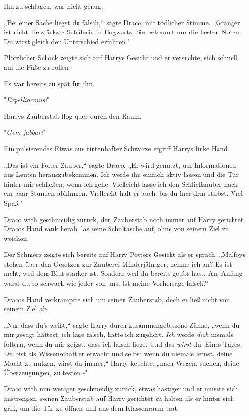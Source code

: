 {Ihn zu schlagen, war nicht genug.

„Bei einer Sache liegst du falsch,“ sagte Draco, mit tödlicher Stimme. „Granger ist nicht die stärkste Schülerin in Hogwarts. Sie bekommt nur die besten Noten. Du wirst gleich den Unterschied erfahren."

Plötzlicher Schock zeigte sich auf Harrys Gesicht und er versuchte, sich schnell auf die Füße zu rollen -

Es war bereits zu spät für ihn.

"\emph{Expelliarmus!}"

Harrys Zauberstab flog quer durch den Raum.

"\emph{Gom jabbar!}"

Ein pulsierendes Etwas aus tintenhafter Schwärze ergriff Harrys linke Hand.

„Das ist ein Folter-Zauber,“ sagte Draco. „Er wird genutzt, um Informationen aus Leuten herauszubekommen. Ich werde ihn einfach aktiv lassen und die Tür hinter mir schließen, wenn ich gehe. Vielleicht lasse ich den Schließzauber nach ein paar Stunden abklingen. Vielleicht hält er auch, bis du hier drin stirbst. Viel Spaß."

Draco wich geschmeidig zurück, den Zauberstab noch immer auf Harry gerichtet. Dracos Hand sank herab, las seine Schultasche auf, ohne von seinem Ziel zu weichen.

Der Schmerz zeigte sich bereits auf Harry Potters Gesicht als er sprach. „Malfoys stehen über den Gesetzen zur Zauberei Minderjähriger, nehme ich an? Es ist nicht, weil dein Blut stärker ist. Sondern weil du bereits geübt hast. Am Anfang warst du so schwach wie jeder von uns. Ist meine Vorhersage falsch?"

Dracos Hand verkrampfte sich um seinen Zauberstab, doch er ließ nicht von seinem Ziel ab.

„Nur dass du's weißt,“ sagte Harry durch zusammengebissene Zähne, „wenn du mir gesagt hättest, ich läge falsch, hätte ich zugehört. \emph{Ich} werde \emph{dich} niemals foltern, wenn du mir zeigst, dass ich falsch liege. Und das \emph{wirst} du. Eines Tages. Du bist als Wissenschaftler erwacht und selbst wenn du niemals lernst, deine Macht zu nutzen, wirst du immer,“ Harry keuchte, „nach Wegen, suchen, deine Überzeugungen, zu testen -"

Draco wich nun weniger geschmeidig zurück, etwas hastiger und er musste sich anstrengen, seinen Zauberstab auf Harry gerichtet zu halten als er hinter sich griff, um die Tür zu öffnen und aus dem Klassenraum trat.

}
